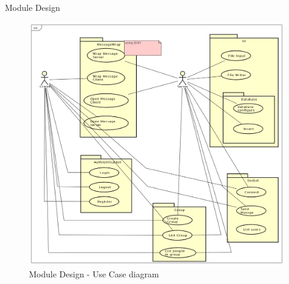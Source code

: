 \documentclass{beamer}
\begin{document}
\begin{frame}{Module Design}
\begin{figure}
\includegraphics[scale=0.2]{usecase.png}
\caption{Module Design - Use Case diagram}
\end{figure}
\end{frame}
\end{document}

